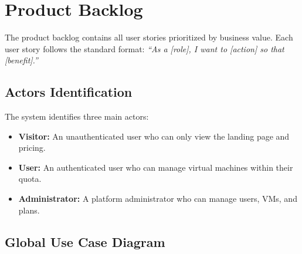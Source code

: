 \section{Product Backlog}

The product backlog contains all user stories prioritized by business value. Each user story follows the standard format: \textit{``As a [role], I want to [action] so that [benefit].''}

\subsection{Actors Identification}

The system identifies three main actors:

\begin{itemize}
  \item \textbf{Visitor:} An unauthenticated user who can only view the landing page and pricing.
  \item \textbf{User:} An authenticated user who can manage virtual machines within their quota.
  \item \textbf{Administrator:} A platform administrator who can manage users, VMs, and plans.
\end{itemize}

\subsection{Global Use Case Diagram}

